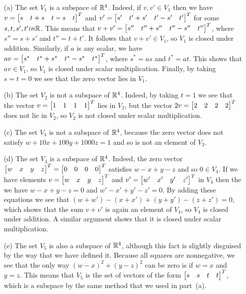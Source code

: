 \documentclass[a4paper]{amsart}
\renewenvironment{solution}{\SolutionInline}{\endSolutionInline}
\begin{document}
\begin{solution}
 \begin{itemize}
  \item[(a)] The set $V_1$ is a subspace of ${\mathbb{R}}^4$.  Indeed, if $v,v'\in V_1$
   then we have $v=\left[\begin{matrix} s&t+s&t-s&t\end{matrix}\right]^T$ and $v'=\left[\begin{matrix}
   s'&t'+s'&t'-s'&t'\end{matrix}\right]^T$ for some $s,t,s',t'in{\mathbb{R}}$.  This means that
   $v+v'=\left[\begin{matrix} s''&t''+s''&t''-s''&t''\end{matrix}\right]^T$, where $s''=s+s'$ and
   $t''=t+t'$.  It follows that $v+v'\in V_1$, so $V_1$ is closed under
   addition.  Similarly, if $a$ is any scalar, we have
   $av=\left[\begin{matrix} s^*&t^*+s^*&t^*-s^*&t^*\end{matrix}\right]^T$, where $s^*=as$ and
   $t^*=at$.  This shows that $av\in V_1$, so $V_1$ is closed under
   scalar multiplication.  Finally, by taking $s=t=0$ we see that the
   zero vector lies in $V_1$.
  \item[(b)] The set $V_2$ is not a subspace of ${\mathbb{R}}^4$.  Indeed, by
   taking $t=1$ we see that the vector $v=\left[\begin{matrix} 1&1&1&1\end{matrix}\right]^T$ lies in
   $V_2$, but the vector $2v=\left[\begin{matrix} 2&2&2&2\end{matrix}\right]^T$ does not lie in
   $V_2$, so $V_2$ is not closed under scalar multiplication.
  \item[(c)] The set $V_3$ is not a subspace of ${\mathbb{R}}^4$, because the
   zero vector does not satisfy $w+10x+100y+1000z=1$ and so is not an
   element of $V_3$.
  \item[(d)] The set $V_4$ is a subspace of ${\mathbb{R}}^4$.  Indeed, the zero
   vector $\left[\begin{matrix} w&x&y&z\end{matrix}\right]^T=\left[\begin{matrix} 0&0&0&0\end{matrix}\right]^T$ satisfies $w-x+y-z$
   and so $0\in V_4$.  If we have elements $v=\left[\begin{matrix} w&x&y&z\end{matrix}\right]^T$ and
   $v'=\left[\begin{matrix} w'&x'&y'&z'\end{matrix}\right]^T$ in $V_4$ then the we have $w-x+y-z=0$
   and $w'-x'+y'-z'=0$.  By adding these equations we see that
   $(w+w')-(x+x')+(y+y')-(z+z')=0$, which shows that the sum $v+v'$ is
   again an element of $V_4$, so $V_4$ is closed under addition.  A
   similar argument shows that it is closed under scalar
   multiplication.
  \item[(e)] The set $V_5$ is also a subspace of ${\mathbb{R}}^4$, although this
   fact is slightly disguised by the way that we have defined it.
   Because all squares are nonnegative, we see that the only way
   $(w-x)^2+(y-z)^2$ can be zero is if $w=x$ and $y=z$.  This means
   that $V_5$ is the set of vectors of the form $\left[\begin{matrix} s&s&t&t\end{matrix}\right]^T$,
   which is a subspace by the same method that we used in part~(a).
 \end{itemize}
\end{solution}
\end{document}
